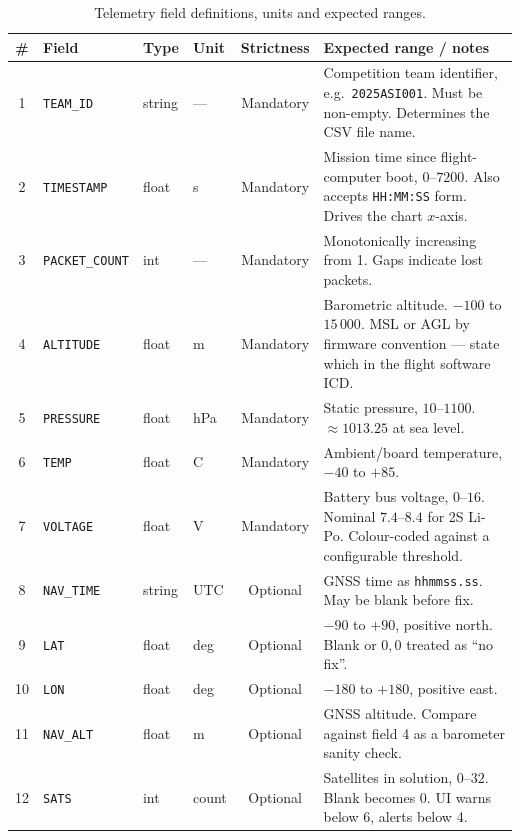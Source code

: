 \documentclass[11pt,a4paper]{article}
\newcommand{\code}[1]{\texttt{#1}}
\newcommand{\degC}{\textdegree C}
\begin{document}
\begin{table}[htbp]
\centering
\caption{Telemetry field definitions, units and expected ranges.}
\label{tab:fields}
\scriptsize
\setlength{\tabcolsep}{4pt}
\renewcommand{\arraystretch}{1.15}
\begin{tabularx}{\textwidth}{@{}clllcX@{}}
\toprule
\textbf{\#} & \textbf{Field} & \textbf{Type} & \textbf{Unit} & \textbf{Strictness} & \textbf{Expected range / notes}\\
\midrule
1  & \code{TEAM\_ID}      & string & ---      & Mandatory & Competition team identifier, e.g.\ \code{2025ASI001}. Must be non-empty. Determines the CSV file name.\\
2  & \code{TIMESTAMP}     & float  & s        & Mandatory & Mission time since flight-computer boot, $0$--$7200$. Also accepts \code{HH:MM:SS} form. Drives the chart $x$-axis.\\
3  & \code{PACKET\_COUNT} & int    & ---      & Mandatory & Monotonically increasing from 1. Gaps indicate lost packets.\\
4  & \code{ALTITUDE}      & float  & m        & Mandatory & Barometric altitude. $-100$ to $15\,000$. MSL or AGL by firmware convention --- state which in the flight software ICD.\\
5  & \code{PRESSURE}      & float  & hPa      & Mandatory & Static pressure, $10$--$1100$. $\approx 1013.25$ at sea level.\\
6  & \code{TEMP}          & float  & \degC    & Mandatory & Ambient/board temperature, $-40$ to $+85$.\\
7  & \code{VOLTAGE}       & float  & V        & Mandatory & Battery bus voltage, $0$--$16$. Nominal $7.4$--$8.4$ for 2S Li-Po. Colour-coded against a configurable threshold.\\
8  & \code{NAV\_TIME}     & string & UTC      & Optional  & GNSS time as \code{hhmmss.ss}. May be blank before fix.\\
9  & \code{LAT}           & float  & deg      & Optional  & $-90$ to $+90$, positive north. Blank or $0,0$ treated as ``no fix''.\\
10 & \code{LON}           & float  & deg      & Optional  & $-180$ to $+180$, positive east.\\
11 & \code{NAV\_ALT}      & float  & m        & Optional  & GNSS altitude. Compare against field 4 as a barometer sanity check.\\
12 & \code{SATS}          & int    & count    & Optional  & Satellites in solution, $0$--$32$. Blank becomes $0$. UI warns below 6, alerts below 4.\\

\end{tabularx}
\end{table}
\end{document}
